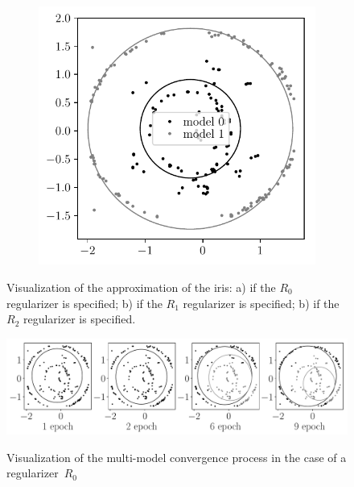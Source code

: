 \documentclass[12pt, twoside]{article}
\numberwithin{equation}{section}
\begin{document}
\begin{figure}
\begin{subfigure}[b]{0.3\textwidth}
         \caption{}
     \end{subfigure}
     \begin{subfigure}[b]{0.3\textwidth}
         \centering
         \includegraphics[width=\textwidth]{figures/prior_regular_real_example}
         \caption{}
     \end{subfigure}
     \caption{ Visualization of the approximation of the iris: a) if the $ R_0 $ regularizer is specified; b) if the $ R_1 $ regularizer is specified; b) if the $ R_2 $ regularizer is specified.}
    \label{ce:fig6}
\end{figure}

\begin{figure}
     \centering
     \includegraphics[width=\textwidth]{figures/experiment_real_not_prior}\\
     
     \caption{Visualization of the multi-model convergence process in the case of a regularizer~$R_0$}
    \label{ce:fig7}
\end{figure}
\end{document}
